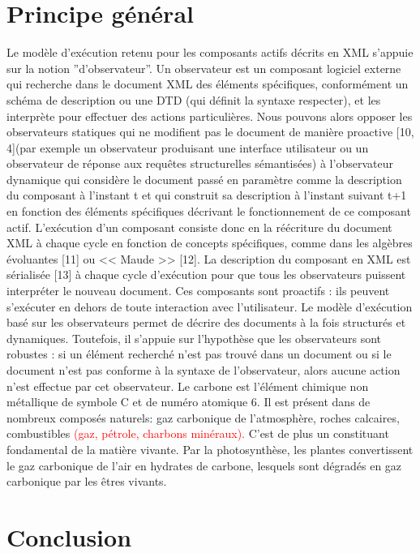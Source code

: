 \documentclass[a4 paper, 10 pt]{article}
\begin{document}
\section{Principe général}

Le modèle d'exécution retenu pour les composants actifs décrits en XML s'appuie sur la notion ''d'observateur''. Un observateur est un composant logiciel externe qui recherche dans le document
XML des éléments spécifiques, conformément  un schéma de description ou  une DTD (qui définit la syntaxe  respecter), et les interprète pour effectuer des actions particulières. Nous pouvons alors opposer les observateurs statiques qui ne modifient pas le document de manière proactive [10, 4](par exemple un observateur produisant une interface utilisateur ou un observateur de réponse aux requêtes structurelles sémantisées)  à l'observateur dynamique qui considère le document passé en paramètre comme la description du composant à l'instant t et qui construit sa description à l'instant suivant t+1 en fonction des éléments spécifiques décrivant le fonctionnement de ce composant actif. L’exécution d'un composant consiste donc en la réécriture du document XML à chaque cycle en fonction de concepts spécifiques, comme dans les algèbres évoluantes [11] ou << Maude >> [12]. La description du composant en XML est sérialisée [13]  à chaque cycle d'exécution pour que tous les observateurs puissent interpréter le  nouveau  document. Ces composants sont proactifs : ils peuvent s'exécuter en dehors de toute interaction avec l'utilisateur.
Le modèle d'exécution basé sur les observateurs permet de décrire des documents à la fois structurés et dynamiques. Toutefois, il s'appuie sur l'hypothèse que les observateurs sont robustes : si un élément recherché n'est pas trouvé dans un document ou si le document n'est pas conforme  à la syntaxe de l'observateur, alors aucune action n'est effectue par cet observateur.
Le carbone est l'élément chimique non métallique de symbole C et de numéro atomique 6. Il est présent dans de nombreux composés naturels: gaz carbonique de l'atmosphère, roches calcaires, combustibles \textcolor{red}{(gaz, pétrole, charbons minéraux).}  C'est de plus un constituant fondamental de la matière vivante. Par la photosynthèse, les plantes convertissent le gaz carbonique de l'air en hydrates de carbone, lesquels sont dégradés en gaz carbonique par les êtres vivants. 
\section{Conclusion}
\end{document}
